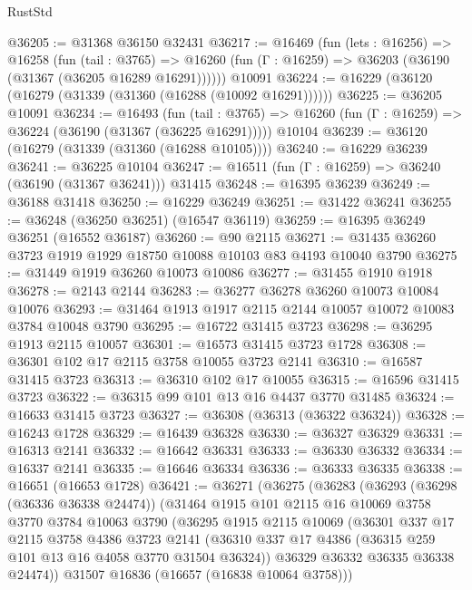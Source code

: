 \begin{lexlean}{RustStd}
\begin{coremodule}
@36205 := @31368 @36150 @32431
@36217 := @16469
    (fun (lets : @16256) =>
    @16258
      (fun (tail : @3765) =>
      @16260 (fun (Γ : @16259) => @36203 (@36190 (@31367 (@36205 @16289 @16291))))))
    @10091
@36224 := @16229 (@36120 (@16279 (@31339 (@31360 (@16288 (@10092 @16291))))))
@36225 := @36205 @10091
@36234 := @16493
    (fun (tail : @3765) => @16260 (fun (Γ : @16259) => @36224 (@36190 (@31367 (@36225 @16291)))))
    @10104
@36239 := @36120 (@16279 (@31339 (@31360 (@16288 @10105))))
@36240 := @16229 @36239
@36241 := @36225 @10104
@36247 := @16511 (fun (Γ : @16259) => @36240 (@36190 (@31367 @36241))) @31415
@36248 := @16395 @36239
@36249 := @36188 @31418
@36250 := @16229 @36249
@36251 := @31422 @36241
@36255 := @36248 (@36250 @36251) (@16547 @36119)
@36259 := @16395 @36249 @36251 (@16552 @36187)
@36260 := @90 @2115
@36271 := @31435 @36260 @3723 @1919 @1929 @18750 @10088 @10103 @83 @4193 @10040 @3790
@36275 := @31449 @1919 @36260 @10073 @10086
@36277 := @31455 @1910 @1918
@36278 := @2143 @2144
@36283 := @36277 @36278 @36260 @10073 @10084 @10076
@36293 := @31464 @1913 @1917 @2115 @2144 @10057 @10072 @10083 @3784 @10048 @3790
@36295 := @16722 @31415 @3723
@36298 := @36295 @1913 @2115 @10057
@36301 := @16573 @31415 @3723 @1728
@36308 := @36301 @102 @17 @2115 @3758 @10055 @3723 @2141
@36310 := @16587 @31415 @3723
@36313 := @36310 @102 @17 @10055
@36315 := @16596 @31415 @3723
@36322 := @36315 @99 @101 @13 @16 @4437 @3770 @31485
@36324 := @16633 @31415 @3723
@36327 := @36308 (@36313 (@36322 @36324))
@36328 := @16243 @1728
@36329 := @16439 @36328
@36330 := @36327 @36329
@36331 := @16313 @2141
@36332 := @16642 @36331
@36333 := @36330 @36332
@36334 := @16337 @2141
@36335 := @16646 @36334
@36336 := @36333 @36335
@36338 := @16651 (@16653 @1728)
@36421 := @36271
    (@36275
      (@36283
        (@36293
          (@36298 (@36336 @36338 @24474))
          (@31464
            @1915
            @101
            @2115
            @16
            @10069
            @3758
            @3770
            @3784
            @10063
            @3790
            (@36295
              @1915
              @2115
              @10069
              (@36301
                @337
                @17
                @2115
                @3758
                @4386
                @3723
                @2141
                (@36310 @337 @17 @4386 (@36315 @259 @101 @13 @16 @4058 @3770 @31504 @36324))
                @36329
                @36332
                @36335
                @36338
                @24474))
            @31507
            @16836
            (@16657 (@16838 @10064 @3758)))

\end{coremodule}
\end{lexlean}

